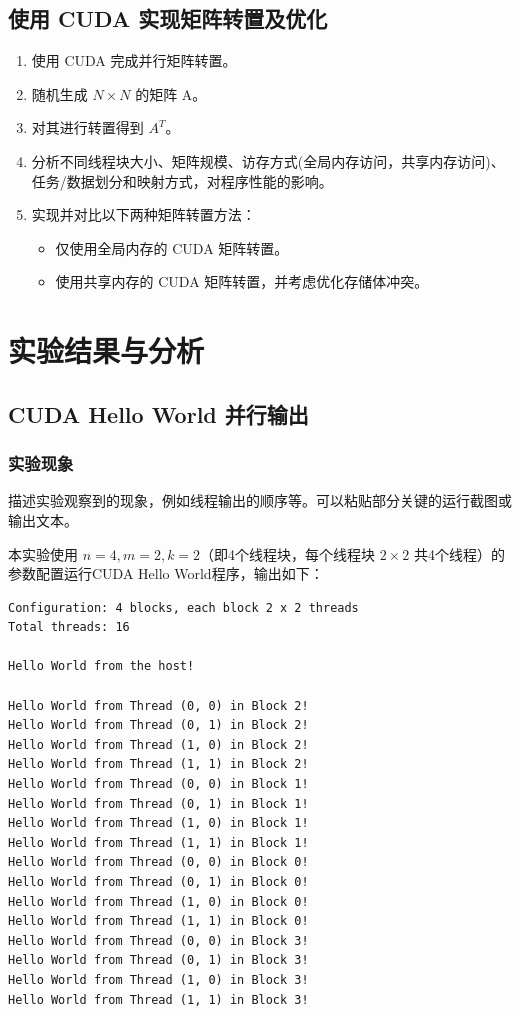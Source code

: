 \documentclass{SYSUReport}
\begin{document}
\subsection{使用 CUDA 实现矩阵转置及优化}
\begin{enumerate}
    \item 使用 CUDA 完成并行矩阵转置。
    \item 随机生成 $N \times N$ 的矩阵 A。
    \item 对其进行转置得到 $A^T$。
    \item 分析不同线程块大小、矩阵规模、访存方式(全局内存访问，共享内存访问)、任务/数据划分和映射方式，对程序性能的影响。
    \item 实现并对比以下两种矩阵转置方法：
    \begin{itemize}
        \item 仅使用全局内存的 CUDA 矩阵转置。
        \item 使用共享内存的 CUDA 矩阵转置，并考虑优化存储体冲突。
    \end{itemize}
\end{enumerate}
\section{实验结果与分析}
\subsection{CUDA Hello World 并行输出}
\subsubsection{实验现象}

描述实验观察到的现象，例如线程输出的顺序等。可以粘贴部分关键的运行截图或输出文本。

本实验使用 $n=4, m=2, k=2$（即4个线程块，每个线程块 $2 \times 2$ 共4个线程）的参数配置运行CUDA Hello World程序，输出如下：

\begin{verbatim}
Configuration: 4 blocks, each block 2 x 2 threads
Total threads: 16

Hello World from the host!

Hello World from Thread (0, 0) in Block 2!
Hello World from Thread (0, 1) in Block 2!
Hello World from Thread (1, 0) in Block 2!
Hello World from Thread (1, 1) in Block 2!
Hello World from Thread (0, 0) in Block 1!
Hello World from Thread (0, 1) in Block 1!
Hello World from Thread (1, 0) in Block 1!
Hello World from Thread (1, 1) in Block 1!
Hello World from Thread (0, 0) in Block 0!
Hello World from Thread (0, 1) in Block 0!
Hello World from Thread (1, 0) in Block 0!
Hello World from Thread (1, 1) in Block 0!
Hello World from Thread (0, 0) in Block 3!
Hello World from Thread (0, 1) in Block 3!
Hello World from Thread (1, 0) in Block 3!
Hello World from Thread (1, 1) in Block 3!
\end{verbatim}
\end{document}
